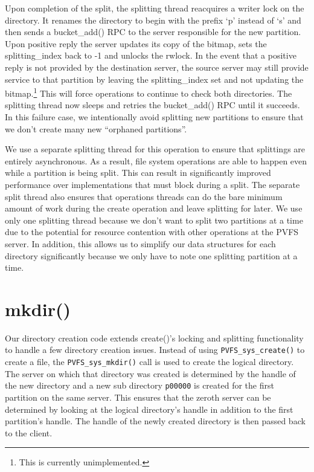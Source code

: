 \documentclass[letterpaper]{article}
\newcommand{\code}[1]{\texttt{#1}}
\begin{document}
Upon completion of the split, the splitting thread reacquires a writer lock on
the directory.  It renames the directory to begin with the prefix `p' instead of
`s' and then sends a bucket\_\-add() RPC to the server responsible for the new
partition.  Upon positive reply the server updates its copy of the bitmap, sets
the splitting\_\-index back to -1 and unlocks the rwlock.  In the event that
a positive reply is not provided by the destination server, the source server
may still provide service to that partition by leaving the splitting\_\-index set
and not updating the bitmap.\footnote{This is currently unimplemented.}  This
will force operations to continue to check both directories.  The splitting
thread now sleeps and retries the bucket\_\-add() RPC until it succeeds.  In
this failure case, we intentionally avoid splitting new partitions to ensure
that we don't create many new ``orphaned partitions''.

We use a separate splitting thread for this operation to ensure that splittings
are entirely asynchronous.  As a result, file system operations are able to
happen even while a partition is being split.  This can result in significantly
improved performance over implementations that must block during a split.  The
separate split thread also ensures that operations threads can do the bare
minimum amount of work during the create operation and leave splitting for
later.  We use only one splitting thread because we don't want to split two
partitions at a time due to the potential for resource contention with other
operations at the PVFS server.  In addition, this allows us to simplify our data
structures for each directory significantly because we only have to note one
splitting partition at a time.

\section{mkdir()}
Our directory creation code extends create()'s locking and splitting
functionality to handle a few directory creation issues.  Instead of using
\code{PVFS\_\-sys\_\-create()} to create a file, the \code{PVFS\_\-sys\_\-mkdir()} call is
used to create the logical directory.  The server on which that directory was
created is determined by the handle of the new directory and a new sub directory
\code{p00000} is created for the first partition on the same server.  This
ensures that the zeroth server can be determined by looking at the logical
directory's handle in addition to the first partition's handle.  The handle of
the newly created directory is then passed back to the client.
\end{document}

